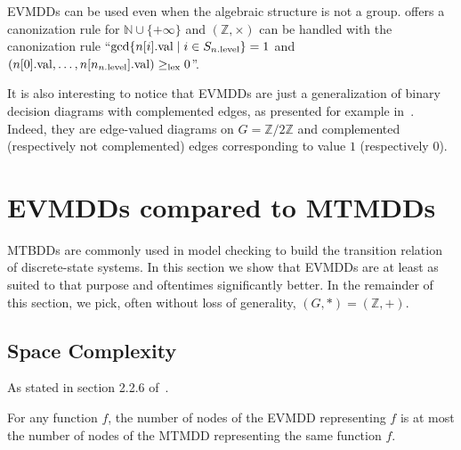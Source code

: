 \documentclass[a4paper,oneside,11pt,pdftex]{llncs}
\newcommand{\N}{\mathbb{N}}
\newcommand{\Z}{\mathbb{Z}}
\newcommand{\val}[1]{#1{\rm .val}}
\newcommand{\level}[1]{#1{\rm .level}}
\begin{document}
EVMDDs can be used even when the algebraic structure is not a group.
\cite{FMCAD2002} offers a canonization rule for $\N\cup \{+\infty\}$ and
$(\Z, \times)$ can be handled with the canonization rule
``${\rm gcd}\{\val{n[i]}\;|\; i \in S_{\level{n}}\} = 1$ and
$(\val{n[0]},\ldots, \val{n[n_{\level{n}}]}) \geq_{\rm lex} 0$''.

It is also interesting to notice that EVMDDs are just a generalization
of binary decision diagrams with complemented edges, as presented for example
in~\cite{Brace1990}. Indeed, they are edge-valued diagrams on $G = \Z/2\Z$
and complemented (respectively not complemented) edges corresponding to value $1$ (respectively $0$).

\section{EVMDDs compared to MTMDDs}

MTBDDs are commonly used in model checking to build the transition relation of discrete-state systems.
In this section we show that EVMDDs are at least as suited to that purpose
and oftentimes significantly better. 
In the remainder of this section, we pick, often without loss of generality, $(G, *) = (\Z, +)$.

\subsection{Space Complexity}

As stated in section 2.2.6 of~\cite{Lai1996}.

\begin{theorem}
  \label{theorem-evmdd-smaller-than-add}
  For any function $f$, the number of nodes of the EVMDD representing $f$
  is at most the number of nodes of the MTMDD representing the same function $f$. 
\end{theorem}
\end{document}
